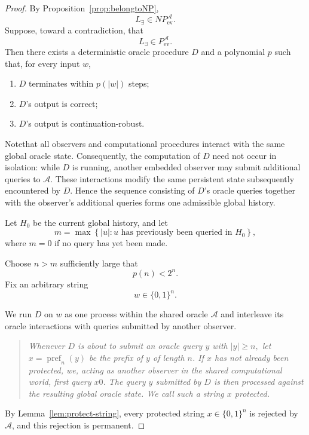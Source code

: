 \documentclass[10pt,a4paper]{amsart}
\begin{document}
\begin{proof}
By Proposition~\ref{prop:belongtoNP},
\[
L_{\exists}\in NP_{\mathrm{ev}}^{\mathcal A}.
\]
Suppose, toward a contradiction, that
\[
L_{\exists}\in P_{\mathrm{ev}}^{\mathcal A}.
\]
Then there exists a deterministic oracle procedure \(D\) and a
polynomial \(p\) such that, for every input \(w\),

\begin{enumerate}[label=(\roman*)]
    \item \(D\) terminates within \(p(|w|)\) steps;
    \item \(D\)'s output is correct;
    \item \(D\)'s output is continuation-robust.
\end{enumerate}

Notethat all observers and computational procedures interact with the same global oracle state. Consequently, the computation of \(D\) need not occur in isolation: while \(D\) is running, another embedded observer may submit additional queries to \(\mathcal A\). These interactions modify the same persistent state subsequently encountered by \(D\). Hence the sequence consisting of \(D\)'s oracle queries together with the observer's additional queries forms one admissible global history.

\vspace{0.1cm}

Let \(H_0\) be the current global history, and let
\[
m
=
\max
\left\{
|u| :
u \text{ has previously been queried in }H_0
\right\},
\]
where \(m=0\) if no query has yet been made.

Choose \(n>m\) sufficiently large that
\[
p(n)<2^n.
\]
Fix an arbitrary string
\[
w\in\{0,1\}^n.
\]

We run \(D\) on \(w\) as one process within the   shared oracle \(\mathcal A\) and interleave its oracle interactions with queries submitted by another observer.

 

\begin{quote}
\textit{Whenever \(D\) is about to submit an oracle query \(y\) with
\(|y|\ge n,\)
let
\(x=\operatorname{pref}_n(y)\)
be the prefix of \(y\) of length \(n\). If \(x\) has not already been
protected, we, acting as another observer in the shared computational world,
first query \(x0\). The query \(y\) submitted by \(D\) is then processed
against the resulting global oracle state. We call such a string \(x\)
\emph{protected}.}
\end{quote}
By Lemma~\ref{lem:protect-string}, every protected string
\(x\in\{0,1\}^n\) is rejected by \(\mathcal A\), and this rejection is
permanent.


\end{proof}
\end{document}
